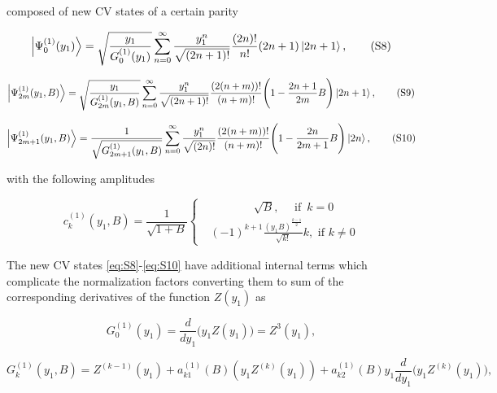 \documentclass{optica-article}
\begin{document}
\!\!\!\!\!\!composed of new CV states of a certain parity        


\begin{equation}\label{eq:S8}
    \ket{\Psi_{0}^{(1)}(y_1)} =
    \sqrt{\frac{y_1}{{G_{0}^{(1)}}(y_1)}}\sum_{n=0}^{\infty} \frac{y_1^{n}}{\sqrt{(2n+1)!}}\frac{(2n)!}{n!}(2n+1)\ket{2n+1},  
\tag{S8}
\end{equation}


\begin{equation}\label{eq:S9}
    \ket{\Psi_{2m}^{(1)}(y_1,B)} =
    \sqrt{\frac{y_1}{{G_{2m}^{(1)}}(y_1,B)}}\sum_{n=0}^{\infty} \frac{y_1^{n}}{\sqrt{(2n+1)!}}\frac{(2(n+m))!}{(n+m)!}\Bigg(1-\frac{2n+1}{2m}B \Bigg)\ket{2n+1},  
\tag{S9}
\end{equation}


\begin{equation}\label{eq:S10}
    \ket{\Psi_{2m+1}^{(1)}(y_1,B)} =
    \frac{1}{\sqrt{G_{2m+1}^{(1)}(y_1,B)}}\sum_{n=0}^{\infty} \frac{y_1^{n}}{\sqrt{(2n)!}}\frac{(2(n+m))!}{(n+m)!}\Bigg(1-\frac{2n}{2m+1}B \Bigg)\ket{2n},  
\tag{S10}
\end{equation}


\!\!\!\!\!\!with the following amplitudes \cite{3}    


\begin{equation}\label{eq:S11}
    c_{k}^{(1)}(y_1,B) =\frac{1}{\sqrt{1 + B}}
    \begin{cases} \,\,\,\,\,\,\,\,\,\,\,\,\,\,\,\,\,\,\,\,\,\,\,\,\,\,\, \sqrt{B}, 
            \,\,\,\,\,\,\,\,\text{if}\,\,\, k = 0 \\[3ex]
			\,\,\,\,(-1)^{k+1}\frac{(y_1B)^{\frac{k-1}{2}}}{\sqrt{k!}}k , \,\,\text{if } k \neq 0  
	\end{cases}
\tag{S11}
\end{equation}


\par The new CV states \eqref{eq:S8}-\eqref{eq:S10}  have additional internal terms which complicate the normalization factors converting them to sum of the corresponding derivatives of the function $Z(y_1)$ as


\begin{equation}\label{eq:S12}
    G_{0}^{(1)}(y_1) = \frac{d}{dy_1}\Big(y_1Z(y_1)\Big) = Z^3(y_1) 
\tag{S12},
\end{equation}


\begin{equation}\label{eq:S13}
    G_{k}^{(1)}(y_1,B) = Z^{(k-1)}(y_1) + a_{k1}^{(1)}(B)(y_1Z^{(k)}(y_1)) + a_{k2}^{(1)}(B)y_1\frac{d}{dy_1}\Big(y_1Z^{(k)}(y_1)\Big), 
\tag{S13}
\end{equation}
\end{document}
